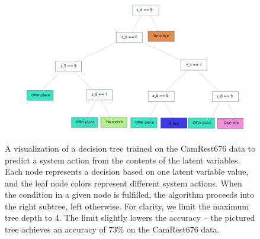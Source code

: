 \begin{figure}[t]
    \centering
    \includegraphics[width=0.95\textwidth]{images/dt2.png}
    \vspace{-5mm}
    \caption{A visualization of a decision tree trained on the CamRest676 data to predict a system action from the contents of the latent variables. Each node represents a decision based on one latent variable value, and the leaf node colors represent different system actions. When the condition in a given node is fulfilled, the algorithm proceeds into the right subtree, left otherwise. For clarity, we limit the maximum tree depth to 4. The limit slightly lowers the accuracy -- the pictured tree achieves an accuracy of 73\% on the CamRest676 data.}
    \label{fig:dt}
\end{figure}

